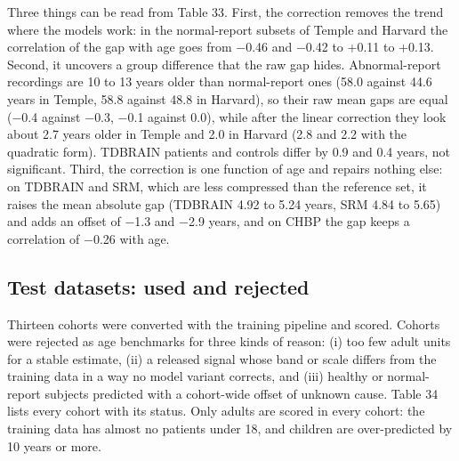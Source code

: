 \documentclass[11pt,a4paper]{article}
\begin{document}
Three things can be read from Table 33. First, the correction removes the trend where the models work: in the normal-report subsets of Temple and Harvard the correlation of the gap with age goes from $-$0.46 and $-$0.42 to +0.11 to +0.13. Second, it uncovers a group difference that the raw gap hides. Abnormal-report recordings are 10 to 13 years older than normal-report ones (58.0 against 44.6 years in Temple, 58.8 against 48.8 in Harvard), so their raw mean gaps are equal ($-$0.4 against $-$0.3, $-$0.1 against 0.0), while after the linear correction they look about 2.7 years older in Temple and 2.0 in Harvard (2.8 and 2.2 with the quadratic form). TDBRAIN patients and controls differ by 0.9 and 0.4 years, not significant. Third, the correction is one function of age and repairs nothing else: on TDBRAIN and SRM, which are less compressed than the reference set, it raises the mean absolute gap (TDBRAIN 4.92 to 5.24 years, SRM 4.84 to 5.65) and adds an offset of $-$1.3 and $-$2.9 years, and on CHBP the gap keeps a correlation of $-$0.26 with age.

\subsection{Test datasets: used and rejected}

Thirteen cohorts were converted with the training pipeline and scored. Cohorts were rejected as age benchmarks for three kinds of reason: (i) too few adult units for a stable estimate, (ii) a released signal whose band or scale differs from the training data in a way no model variant corrects, and (iii) healthy or normal-report subjects predicted with a cohort-wide offset of unknown cause. Table 34 lists every cohort with its status. Only adults are scored in every cohort: the training data has almost no patients under 18, and children are over-predicted by 10 years or more.
\end{document}
